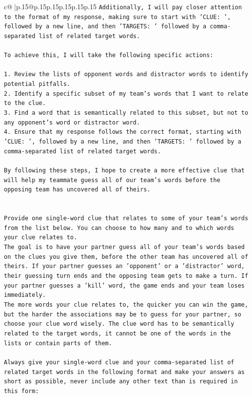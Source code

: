 \documentclass{article}
\begin{document}
{\begin{supertabular}{c@{$\;$}|p{.15\linewidth}@{}p{.15\linewidth}p{.15\linewidth}p{.15\linewidth}p{.15\linewidth}p{.15\linewidth}}
{{{\texttt{Additionally, I will pay closer attention to the format of my response, making sure to start with 'CLUE: ', followed by a new line, and then 'TARGETS: ' followed by a comma{-}separated list of related target words.} \\
\\ 
\texttt{To achieve this, I will take the following specific actions:} \\
\\ 
\texttt{1. Review the lists of opponent words and distractor words to identify potential pitfalls.} \\
\texttt{2. Identify a specific subset of my team's words that I want to relate to the clue.} \\
\texttt{3. Find a word that is semantically related to this subset, but not to any opponent's word or distractor word.} \\
\texttt{4. Ensure that my response follows the correct format, starting with 'CLUE: ', followed by a new line, and then 'TARGETS: ' followed by a comma{-}separated list of related target words.} \\
\\ 
\texttt{By following these steps, I hope to create a more effective clue that will help my teammate guess all of our team's words before the opposing team has uncovered all of theirs.} \\
\\ 
\\ 
\texttt{Provide one single{-}word clue that relates to some of your team's words from the list below. You can choose to how many and to which words your clue relates to.} \\
\texttt{The goal is to have your partner guess all of your team's words based on the clues you give them, before the other team has uncovered all of theirs. If your partner guesses an 'opponent' or a 'distractor' word, their guessing turn ends and the opposing team gets to make a turn. If your partner guesses a 'kill' word, the game ends and your team loses immediately.} \\
\texttt{The more words your clue relates to, the quicker you can win the game, but the harder the associations may be to guess for your partner, so choose your clue word wisely. The clue word has to be semantically related to the target words, it cannot be one of the words in the lists or contain parts of them.} \\
\\ 
\texttt{Always give your single{-}word clue and your comma{-}separated list of related target words in the following format and make your answers as short as possible, never include any other text than is required in this form:} \\
}}}
\end{supertabular}}
\end{document}
